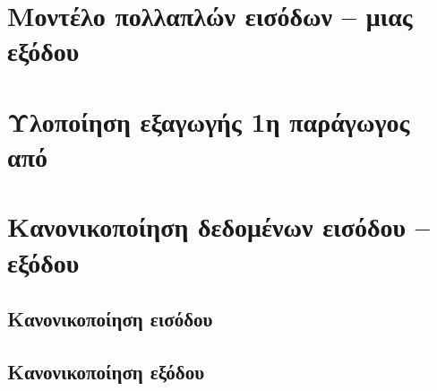 \section{Μοντέλο πολλαπλών εισόδων -- μιας εξόδου}

\section{Υλοποίηση εξαγωγής  1η παράγωγος από }

\section{Κανονικοποίηση δεδομένων εισόδου -- εξόδου}

\subsection{Κανονικοποίηση εισόδου}

\subsection{Κανονικοποίηση εξόδου}
